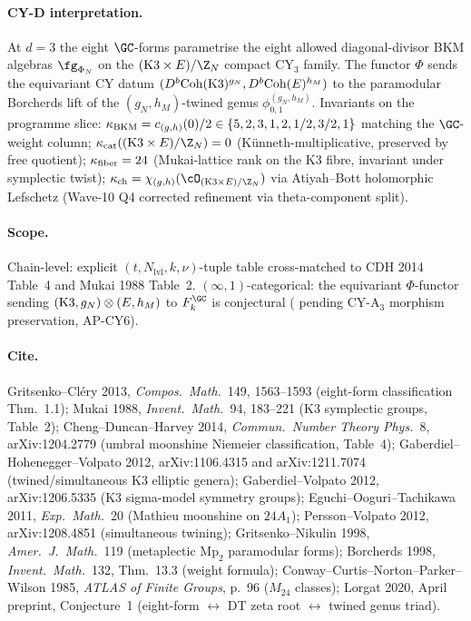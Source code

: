 \paragraph{CY-D interpretation.}\ClaimStatusTheorem{}
At $d = 3$ the eight $\GC$-forms parametrise the eight allowed
diagonal-divisor BKM algebras $\fg_{\Phi_N}$ on the
$(\K \times E)/\Z_N$ compact CY$_3$ family.  The functor $\Phi$
sends the equivariant CY datum
$(D^b\mathrm{Coh}(\mathrm{K3})^{g_N}, D^b\mathrm{Coh}(E)^{h_M})$ to the
paramodular Borcherds lift of the $(g_N, h_M)$-twined genus
$\phi^{(g_N, h_M)}_{0,1}$.  Invariants on the programme slice:
$\kappa_{\mathrm{BKM}} = c_{(g,h)}(0)/2 \in \{5, 2, 3, 1, 2, 1/2, 3/2, 1\}$
matching the $\GC$-weight column; $\kcat((\K \times E)/\Z_N) = 0$
(K\"unneth-multiplicative, preserved by free quotient); $\kappa_{\mathrm{fiber}} = 24$
(Mukai-lattice rank on the K3 fibre, invariant under symplectic
twist); $\kch = \chi_{(g,h)}(\cO_{(\K \times E)/\Z_N})$ via
Atiyah--Bott holomorphic Lefschetz (Wave-10 Q4 corrected
refinement via theta-component split).

\paragraph{Scope.}
Chain-level: explicit $(t, N_{\mathrm{lvl}}, k, \nu)$-tuple table
cross-matched to CDH 2014 Table~4 and Mukai 1988 Table~2.
$(\infty,1)$-categorical: the equivariant $\Phi$-functor sending
$(\mathrm{K3}, g_N) \otimes (E, h_M)$ to $F_k^{\GC}$ is conjectural
(\ClaimStatusConjectured{} pending CY-A$_3$ morphism preservation,
AP-CY$6$).

\paragraph{Cite.}
Gritsenko--Cl\'ery 2013, \emph{Compos.\ Math.}~149, 1563--1593
(eight-form classification Thm.~1.1);
Mukai 1988, \emph{Invent.\ Math.}~94, 183--221 (K3 symplectic
groups, Table~2);
Cheng--Duncan--Harvey 2014, \emph{Commun.\ Number Theory Phys.}~8,
arXiv:1204.2779 (umbral moonshine Niemeier classification, Table~4);
Gaberdiel--Hohenegger--Volpato 2012, arXiv:1106.4315 and
arXiv:1211.7074 (twined/simultaneous K3 elliptic genera);
Gaberdiel--Volpato 2012, arXiv:1206.5335 (K3 sigma-model symmetry
groups);
Eguchi--Ooguri--Tachikawa 2011, \emph{Exp.\ Math.}~20 (Mathieu
moonshine on $24A_1$);
Persson--Volpato 2012, arXiv:1208.4851 (simultaneous twining);
Gritsenko--Nikulin 1998, \emph{Amer.\ J.\ Math.}~119 (metaplectic
$\mathrm{Mp}_2$ paramodular forms);
Borcherds 1998, \emph{Invent.\ Math.}~132, Thm.~13.3 (weight formula);
Conway--Curtis--Norton--Parker--Wilson 1985, \emph{ATLAS of Finite
Groups}, p.~96 ($M_{24}$ classes);
Lorgat 2020, April preprint, Conjecture~1 (eight-form $\leftrightarrow$
DT zeta root $\leftrightarrow$ twined genus triad).

